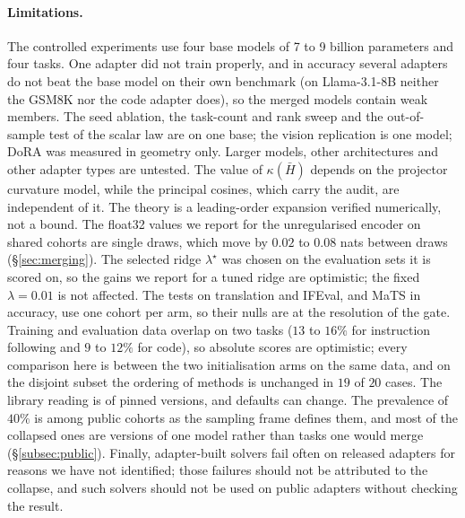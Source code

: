\paragraph{Limitations.} The controlled experiments use four base models of 7
to 9 billion parameters and four tasks. One adapter did not train properly,
and in accuracy several adapters do not beat the base model on their own
benchmark (on Llama-3.1-8B neither the GSM8K nor the code adapter does), so the
merged models contain weak members. The seed ablation, the task-count and rank
sweep and the out-of-sample test of the scalar law are on one base; the vision
replication is one model; DoRA was measured in geometry only. Larger models,
other architectures and other adapter types are untested. The value of
$\kappa(\bar H)$ depends on the projector curvature model, while the principal
cosines, which carry the audit, are independent of it. The theory is a
leading-order expansion verified numerically, not a bound. The float32 values
we report for the unregularised encoder on shared cohorts are single draws,
which move by $0.02$ to $0.08$ nats between draws (\S\ref{sec:merging}). The
selected ridge $\lambda^\star$ was chosen on the evaluation sets it is scored
on, so the gains we report for a tuned ridge are optimistic; the fixed
$\lambda = 0.01$ is not affected. The tests on translation and IFEval, and
MaTS in accuracy, use one cohort per arm, so their nulls are at the resolution
of the gate. Training and evaluation data overlap on two tasks ($13$ to $16\%$
for instruction following and $9$ to $12\%$ for code), so absolute scores are
optimistic; every comparison here is between the two initialisation arms on
the same data, and on the disjoint subset the ordering of methods is unchanged
in $19$ of $20$ cases. The library reading is of pinned versions, and defaults
can change. The prevalence of $40\%$ is among public cohorts as the sampling
frame defines them, and most of the collapsed ones are versions of one model
rather than tasks one would merge (\S\ref{subsec:public}). Finally,
adapter-built solvers fail often on released adapters for reasons we have not
identified; those failures should not be attributed to the collapse, and such
solvers should not be used on public adapters without checking the result.
